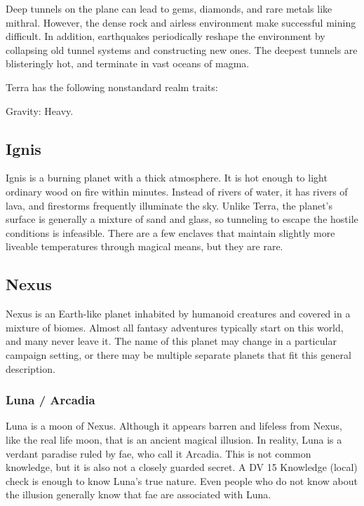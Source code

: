     Deep tunnels on the plane can lead to gems, diamonds, and rare metals like mithral.
    However, the dense rock and airless environment make successful mining difficult.
    In addition, earthquakes periodically reshape the environment by collapsing old tunnel systems and constructing new ones.
    The deepest tunnels are blisteringly hot, and terminate in vast oceans of magma.

    Terra has the following nonstandard realm traits:
    \begin{raggeditemize}
      \item Gravity: Heavy.
    \end{raggeditemize}

  \subsection{Ignis}
    Ignis is a burning planet with a thick atmosphere.
    It is hot enough to light ordinary wood on fire within minutes.
    Instead of rivers of water, it has rivers of lava, and firestorms frequently illuminate the sky.
    Unlike Terra, the planet's surface is generally a mixture of sand and glass, so tunneling to escape the hostile conditions is infeasible.
    There are a few enclaves that maintain slightly more liveable temperatures through magical means, but they are rare.

  \subsection{Nexus}
    Nexus is an Earth-like planet inhabited by humanoid creatures and covered in a mixture of biomes.
    Almost all fantasy adventures typically start on this world, and many never leave it.
    The name of this planet may change in a particular campaign setting, or there may be multiple separate planets that fit this general description.

    \subsubsection{Luna / Arcadia}
      Luna is a moon of Nexus.
      Although it appears barren and lifeless from Nexus, like the real life moon, that is an ancient magical illusion.
      In reality, Luna is a verdant paradise ruled by fae, who call it Arcadia.
      This is not common knowledge, but it is also not a closely guarded secret.
      A DV 15 Knowledge (local) check is enough to know Luna's true nature.
      Even people who do not know about the illusion generally know that fae are associated with Luna.


